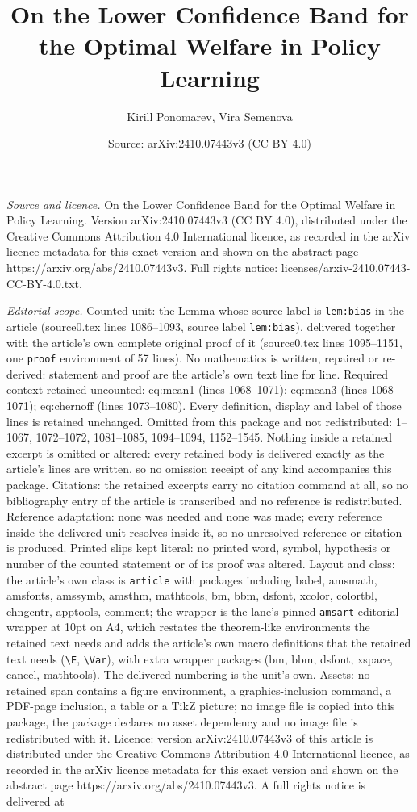 \documentclass[10pt,a4paper]{amsart}
\title[On the Lower Confidence Band for the Optimal Welfare in Poli]{On the Lower Confidence Band for the Optimal Welfare in Policy Learning}
\author{Kirill Ponomarev, Vira Semenova}
\date{Source: arXiv:2410.07443v3 (CC BY 4.0)}
\begin{document}
\maketitle

\noindent\emph{Source and licence.} On the Lower Confidence Band for the Optimal Welfare in Policy Learning. Version arXiv:2410.07443v3 (CC BY 4.0), distributed under the Creative Commons Attribution 4.0 International licence, as recorded in the arXiv licence metadata for this exact version and shown on the abstract page https://arxiv.org/abs/2410.07443v3. Full rights notice: licenses/arxiv-2410.07443-CC-BY-4.0.txt.\par\smallskip

\noindent\textit{Editorial scope.} Counted unit: the Lemma whose source label is \texttt{lem:bias} in the article (source0.tex lines 1086--1093, source label \texttt{lem:bias}), delivered together with the article's own complete original proof of it (source0.tex lines 1095--1151, one \texttt{proof} environment of 57 lines). No mathematics is written, repaired or re-derived: statement and proof are the article's own text line for line. Required context retained uncounted: eq:mean1 (lines 1068--1071); eq:mean3 (lines 1068--1071); eq:chernoff (lines 1073--1080). Every definition, display and label of those lines is retained unchanged. Omitted from this package and not redistributed: 1--1067, 1072--1072, 1081--1085, 1094--1094, 1152--1545. Nothing inside a retained excerpt is omitted or altered: every retained body is delivered exactly as the article's lines are written, so no omission receipt of any kind accompanies this package. Citations: the retained excerpts carry no citation command at all, so no bibliography entry of the article is transcribed and no reference is redistributed. Reference adaptation: none was needed and none was made; every reference inside the delivered unit resolves inside it, so no unresolved reference or citation is produced. Printed slips kept literal: no printed word, symbol, hypothesis or number of the counted statement or of its proof was altered. Layout and class: the article's own class is \texttt{article} with packages including babel, amsmath, amsfonts, amssymb, amsthm, mathtools, bm, bbm, dsfont, xcolor, colortbl, chngcntr, apptools, comment; the wrapper is the lane's pinned \texttt{amsart} editorial wrapper at 10pt on A4, which restates the theorem-like environments the retained text needs and adds the article's own macro definitions that the retained text needs (\texttt{\textbackslash E}, \texttt{\textbackslash Var}), with extra wrapper packages (bm, bbm, dsfont, xspace, cancel, mathtools). The delivered numbering is the unit's own. Assets: no retained span contains a figure environment, a graphics-inclusion command, a PDF-page inclusion, a table or a TikZ picture; no image file is copied into this package, the package declares no asset dependency and no image file is redistributed with it. Licence: version arXiv:2410.07443v3 of this article is distributed under the Creative Commons Attribution 4.0 International licence, as recorded in the arXiv licence metadata for this exact version and shown on the abstract page https://arxiv.org/abs/2410.07443v3. A full rights notice is delivered at 
\end{document}
